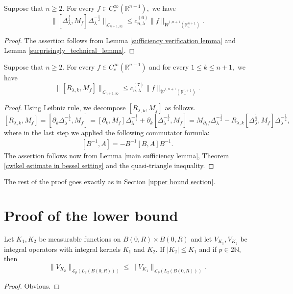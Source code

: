 \documentclass[12pt]{amsart}
\begin{document}
\begin{lemma}\label{main sufficiency lemma} Suppose that $n\geq 2.$ For every $f\in C^{\infty}_c(\mathbb{R}^{n+1}),$ we have
$$\|[\Delta_\lambda^{\frac12},M_f]\Delta_\lambda^{-\frac12}\|_{\mathcal{L}_{n+1,\infty}}\leq c_{n,\lambda}^{(6)}\|f\|_{\dot{W}^{1,n+1}(\mathbb{R}_+^{n+1})}.$$
\end{lemma}
\begin{proof} The assertion follows from Lemma \ref{sufficiency verification lemma} and Lemma \ref{surprisingly_technical_lemma}.
\end{proof}


\begin{lemma}\label{final sufficiency lemma} Suppose that $n\geq 2.$ For every $f\in C^{\infty}_c(\mathbb{R}^{n+1})$ and for every $1\leq k\leq n+1,$ we have
$$\|[R_{\lambda,k},M_f]\|_{\mathcal{L}_{n+1,\infty}}\leq c_{n,\lambda}^{(7)}\|f\|_{\dot{W}^{1,n+1}(\mathbb{R}_+^{n+1})}.$$
\end{lemma}
\begin{proof} Using Leibniz rule, we decompose $[R_{\lambda,k},M_f]$ as follows.
$$[R_{\lambda,k},M_f]=[\partial_k\Delta_\lambda^{-\frac12},M_f]=[\partial_k,M_f]\Delta_\lambda^{-\frac12}+\partial_k[\Delta_\lambda^{-\frac12},M_f]=M_{\partial_k f}\Delta_\lambda^{-\frac12}-R_{\lambda,k}[\Delta_\lambda^{\frac12},M_f]\Delta_\lambda^{-\frac12},$$
where in the last step we applied the following commutator formula:
\begin{align}\label{commutator}
[B^{-1},A]=-B^{-1}[B,A]B^{-1}.
\end{align}
The assertion follows now from Lemma \ref{main sufficiency lemma}, Theorem \ref{cwikel estimate in bessel setting} and the quasi-triangle inequality.
\end{proof}

The rest of the proof goes exactly as in Section \ref{upper bound section}.

\section{Proof of the lower bound}
\setcounter{equation}{0}

\begin{lemma}\label{positive schur lemma} Let $K_1,K_2$ be measurable functions on $B(0,R)\times B(0,R)$ and let $V_{K_1},V_{K_2}$ be integral operators with integral kernels $K_1$ and $K_2.$ If $|K_2|\leq K_1$ and if $p\in2\mathbb{N},$ then
$$\|V_{K_2}\|_{\mathcal{L}_p(L_2(B(0,R)))}\leq\|V_{K_1}\|_{\mathcal{L}_p(L_2(B(0,R)))}.$$
\end{lemma}
\begin{proof} Obvious.
\end{proof}
\end{document}

